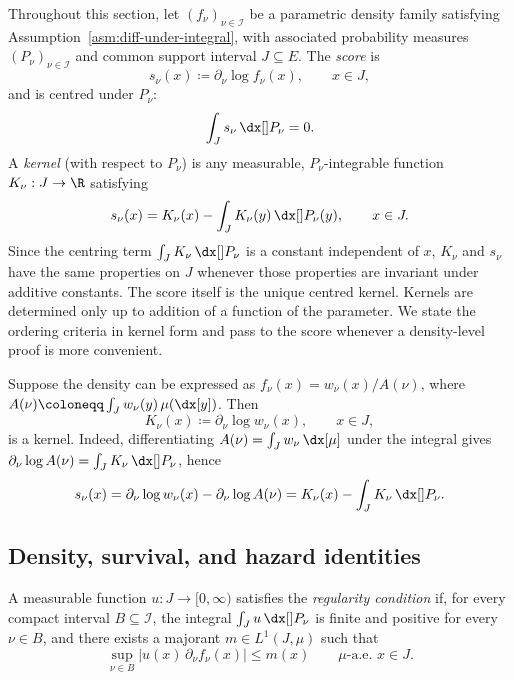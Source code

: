 \documentclass[11pt]{article}
\begin{document}
Throughout this section, let \((f_\nu)_{\nu\in\mathcal I}\) be a parametric density family satisfying Assumption~\ref{asm:diff-under-integral}, with associated probability measures \((P_\nu)_{\nu\in\mathcal I}\) and common support interval \(J\subseteq E\). The \emph{score} is
\begin{equation}\label{def.score}
s_\nu(x)\coloneqq \partial_\nu\log f_\nu(x),\qquad x\in J,
\end{equation}
and is centred under $P_\nu$:
\[
\int_J s_\nu\,\dx[]P_\nu=0.
\]
A \emph{kernel} (with respect to $P_\nu$) is any measurable, \(P_\nu\)-integrable function \(K_\nu:J\to\R\) satisfying
\begin{equation}\label{def.log.companion}
s_\nu(x)=K_\nu(x)-\int_J K_\nu(y)\,\dx[]P_\nu(y),\qquad x\in J.
\end{equation}
Since the centring term \(\int_J K_\nu\,\dx[]P_\nu\) is a constant independent of $x$, \(K_\nu\) and \(s_\nu\) have the same properties on \(J\) whenever those properties are invariant under additive constants. The score itself is the unique centred kernel. Kernels are determined only up to addition of a function of the parameter. We state the ordering criteria in kernel form and pass to the score whenever a density-level proof is more convenient.
\begin{rem}
Suppose the density can be expressed as $f_\nu(x)={w_\nu(x)}/{A(\nu)}$, where $A(\nu)\coloneqq \int_J w_\nu(y)\,\mu(\dx[y])$. Then
	\begin{equation}\label{def.kernel}
		K_\nu(x)\coloneqq \partial_\nu\log w_\nu(x),\qquad x\in J,
	\end{equation}
	is a kernel. Indeed, differentiating \(A(\nu)=\int_J w_\nu\,\dx[\mu]\) under the integral gives \(\partial_\nu\log A(\nu)=\int_J K_\nu\,\dx[]P_\nu\), hence
	\[
	s_\nu(x) =\partial_\nu\log w_\nu(x)-\partial_\nu\log A(\nu) =K_\nu(x)-\int_J K_\nu\,\dx[]P_\nu.
	\]
\end{rem}

\subsection{Density, survival, and hazard identities}\label{subsec:density-survival-hazard}

\begin{defn}
\label{def:regularity-condition}
A measurable function \(u:J\to[0,\infty)\) satisfies the \emph{regularity condition} if, for every compact interval \(B\subseteq\mathcal I\), the integral \(\int_J u\,\dx[]P_\nu\) is finite and positive for every \(\nu\in B\), and there exists a majorant \(m\in L^1(J,\mu)\) such that
\[
\sup_{\nu\in B}\bigl|u(x)\,\partial_\nu f_\nu(x)\bigr|\le m(x)
\qquad \mu\text{-a.e. } x\in J.
\]
\end{defn}
\end{document}

